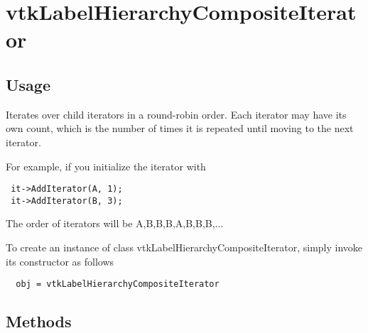 \section{vtkLabelHierarchyCompositeIterator}

\subsection{Usage}

 Iterates over child iterators in a round-robin order. Each iterator may
 have its own count, which is the number of times it is repeated until
 moving to the next iterator.
 
 For example, if you initialize the iterator with
 \begin{verbatim}
 it->AddIterator(A, 1);
 it->AddIterator(B, 3);
 \end{verbatim}
 The order of iterators will be A,B,B,B,A,B,B,B,...

To create an instance of class vtkLabelHierarchyCompositeIterator, simply
invoke its constructor as follows
\begin{verbatim}
  obj = vtkLabelHierarchyCompositeIterator
\end{verbatim}
\subsection{Methods}

